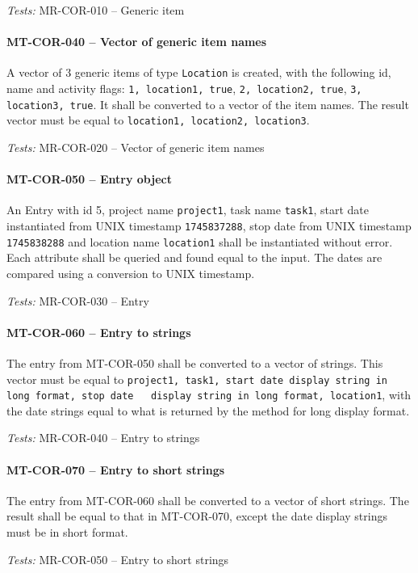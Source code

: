 \textit{Tests: } MR-COR-010 -- Generic item

\paragraph{MT-COR-040 -- Vector of generic item names}
A vector of 3 generic items of type \lstinline{Location} is created,
with the following id, name and activity flags:
\lstinline{1, location1, true}, \lstinline{2, location2, true},
\lstinline{3, location3, true}.
It shall be converted to a vector of the item names.
The result vector must be equal to \lstinline{location1, location2, location3}.

\textit{Tests: } MR-COR-020 -- Vector of generic item names

\paragraph{MT-COR-050 -- Entry object}
An Entry with id 5, project name \lstinline{project1}, task name
\lstinline{task1}, start date instantiated from UNIX timestamp
\lstinline{1745837288}, stop date from UNIX timestamp
\lstinline{1745838288} and location name \lstinline{location1}
shall be instantiated without error.
Each attribute shall be queried and found equal to the input.
The dates are compared using a conversion to UNIX timestamp.

\textit{Tests: } MR-COR-030 -- Entry

\paragraph{MT-COR-060 -- Entry to strings}
The entry from MT-COR-050 shall be converted to a vector of strings.
This vector must be equal to
\lstinline{project1, task1, start date display string in long format, stop date
  display string in long format, location1},
with the date strings equal to what is returned by the method for long
display format.

\textit{Tests: } MR-COR-040 -- Entry to strings

\paragraph{MT-COR-070 -- Entry to short strings}
The entry from MT-COR-060 shall be converted to a vector of short strings.
The result shall be equal to that in MT-COR-070, except the date display
strings must be in short format.

\textit{Tests: } MR-COR-050 -- Entry to short strings

